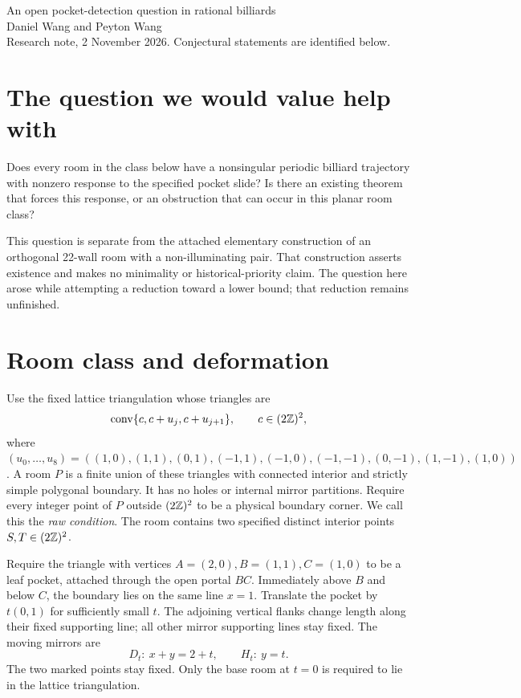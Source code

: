 \documentclass[11pt]{article}
\begin{document}
\begin{center}
{\Large An open pocket-detection question in rational billiards}\\[4pt]
Daniel Wang and Peyton Wang\\
\small Research note, 2 November 2026. Conjectural statements are identified below.
\end{center}

\section*{The question we would value help with}
Does every room in the class below have a nonsingular periodic billiard trajectory with nonzero response to the specified pocket slide? Is there an existing theorem that forces this response, or an obstruction that can occur in this planar room class?

This question is separate from the attached elementary construction of an orthogonal 22-wall room with a non-illuminating pair. That construction asserts existence and makes no minimality or historical-priority claim. The question here arose while attempting a reduction toward a lower bound; that reduction remains unfinished.

\section*{Room class and deformation}
Use the fixed lattice triangulation whose triangles are
\[
\operatorname{conv}\{c,c+u_j,c+u_{j+1}\},\qquad c\in(2\mathbb Z)^2,
\]
where $(u_0,\ldots,u_8)=((1,0),(1,1),(0,1),(-1,1),(-1,0),
(-1,-1),(0,-1),(1,-1),(1,0))$.
A room $P$ is a finite union of these triangles with connected interior and strictly simple polygonal boundary. It has no holes or internal mirror partitions. Require every integer point of $P$ outside $(2\mathbb Z)^2$ to be a physical boundary corner. We call this the \emph{raw condition}. The room contains two specified distinct interior points $S,T\in(2\mathbb Z)^2$.

Require the triangle with vertices $A=(2,0), B=(1,1), C=(1,0)$ to be a leaf pocket, attached through the open portal $BC$. Immediately above $B$ and below $C$, the boundary lies on the same line $x=1$. Translate the pocket by $t(0,1)$ for sufficiently small $t$. The adjoining vertical flanks change length along their fixed supporting line; all other mirror supporting lines stay fixed. The moving mirrors are
\[
 D_t:\ x+y=2+t,\qquad H_t:\ y=t.
\]
The two marked points stay fixed. Only the base room at $t=0$ is required to lie in the lattice triangulation.
\end{document}
